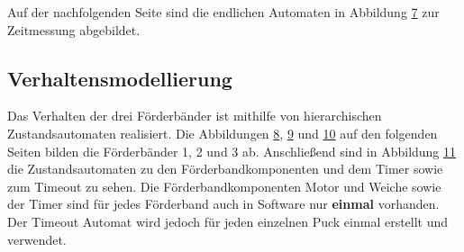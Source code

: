 \documentclass[a4paper, 11pt]{article}
\begin{document}
\noindent Auf der nachfolgenden Seite sind die endlichen Automaten in Abbildung \hyperref[sec:timemeasure]{7} zur Zeitmessung abgebildet.
\label{sec:timemeasure}

\newpage

\subsection{Verhaltensmodellierung}
Das Verhalten der drei Förderbänder ist mithilfe von hierarchischen Zustandsautomaten realisiert. Die Abbildungen \hyperref[sec:hsm1]{8}, \hyperref[sec:hsm2]{9} und \hyperref[sec:hsm3]{10} auf den folgenden Seiten bilden die Förderbänder 1, 2 und 3 ab. Anschließend sind in Abbildung \hyperref[sec:hsm4]{11} die Zustandsautomaten zu den Förderbandkomponenten und dem Timer sowie zum Timeout zu sehen. Die Förderbandkomponenten Motor und Weiche sowie der Timer sind für jedes Förderband auch in Software nur \textbf{einmal} vorhanden. Der Timeout Automat wird jedoch für jeden einzelnen Puck einmal erstellt und verwendet.

\newpage
{}
\label{sec:hsm1}

\newpage
{}
\label{sec:hsm2}

\newpage
{}
\label{sec:hsm3}

\newpage
{}
\label{sec:hsm4}
\end{document}
